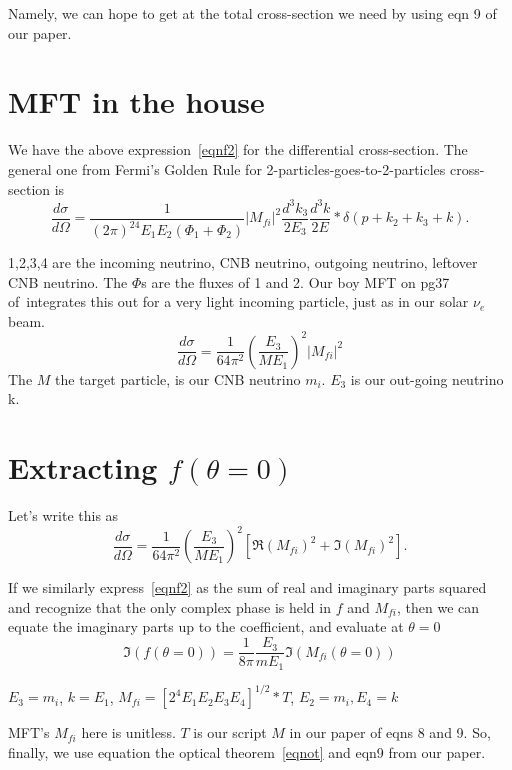 \documentclass[reprint,onecolumn,superscriptaddress,preprintnumbers]{revtex4}%
\begin{document}
Namely, we can hope to get at the total cross-section we need by using eqn 9 of our paper.

\section{MFT in the house}
We have the above expression~\ref{eqnf2} for the differential cross-section. The general one from Fermi's Golden Rule for 2-particles-goes-to-2-particles cross-section is
\begin{equation}
\frac{d\sigma}{d\Omega} = \frac{1}{(2\pi)^24E_1E_2(\Phi_1+\Phi_2)} |M_{fi}|^2 \frac{d^3k_3}{2E_3} \frac{d^3k}{2E} *\delta(p+k_2+k_3+k).
\end{equation}

1,2,3,4 are the incoming neutrino, CNB neutrino, outgoing neutrino, leftover CNB neutrino. The $\Phi$s are the fluxes of 1 and 2. Our boy MFT on pg37 of~\cite{mft}integrates this out for a very light incoming particle, just as in our solar $\nu_e$ beam.
\begin{equation}
\frac{d\sigma}{d\Omega} = \frac{1}{64\pi^2}(\frac{E_3}{ME_1})^2 |M_{fi}|^2
\end{equation}
The $M$  the target particle, is our CNB neutrino $m_i$. $E_3$ is our out-going neutrino k. 

\section{Extracting $f(\theta=0)$}
Let's write this as 
\begin{equation}
\frac{d\sigma}{d\Omega} = \frac{1}{64\pi^2}(\frac{E_3}{ME_1})^2[\Re(M_{fi})^2+\Im(M_{fi})^2].
\end{equation}

If we similarly express~\ref{eqnf2} as the sum of real and imaginary parts squared and recognize that the only complex phase is held in $f$ and $M_{fi}$, then we can equate
the imaginary parts up to the coefficient, and evaluate at $\theta=0$
\begin{equation}
\Im (f(\theta=0)) = \frac{1}{8\pi}\frac{E_3}{mE_1}\Im(M_{fi}(\theta=0))
\end{equation}

$E_3 = m_i$, $k=E_1$, $M_{fi}=[2^4E_1E_2E_3E_4]^{1/2}*T$, $E_2=m_i, E_4=k$

MFT's $M_{fi}$ here is unitless. $T$ is our script $M$ in our paper of eqns 8 and 9. So, finally, we use equation the optical theorem~\ref{eqnot} and eqn9 from our paper.
\end{document}
